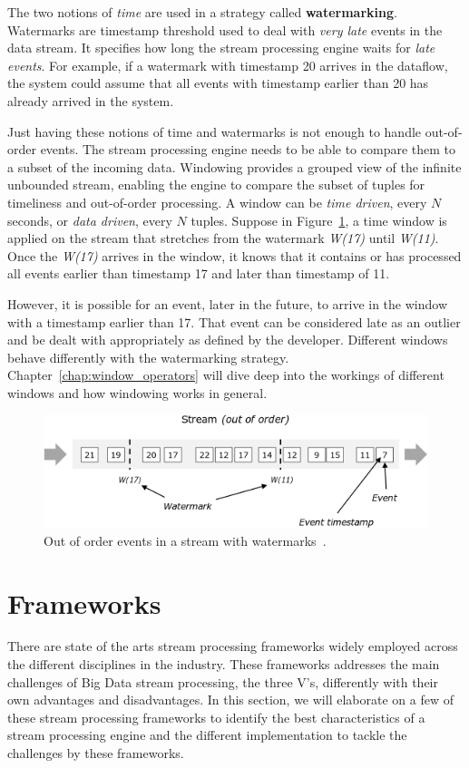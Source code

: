 The two notions of \emph{time} are used in a strategy called \textbf{watermarking}. 
Watermarks are timestamp threshold used to deal with \emph{very late} events 
in the data stream. It specifies how long the stream processing engine 
waits for \emph{late events}. For example, if a watermark with timestamp 
20 arrives in the dataflow, the system could assume that all events 
with timestamp earlier than 20 has already arrived in the system. 

Just having these notions of time and watermarks is not enough to 
handle out-of-order events. The stream processing engine needs to be able to compare them to a subset of the 
incoming data. Windowing provides a grouped view of the infinite unbounded stream, 
enabling the engine to compare the subset of tuples for timeliness and out-of-order 
processing. A window can be \emph{time driven}, every $N$ seconds, or \emph{data driven}, 
every $N$ tuples. 
Suppose in Figure~\ref{fig:watermark}, a time window is applied on the stream that
stretches from the watermark \emph{W(17)} until \emph{W(11)}. 
Once the \emph{W(17)} arrives in the window, it knows that it contains or has 
processed all events earlier than timestamp 17 and later than timestamp of 11.  

However, it is possible for an event, later in the future, to arrive in the window 
with a timestamp earlier than 17. That event can be considered late as an outlier and 
be dealt with appropriately as defined by the developer. Different windows 
behave differently with the watermarking strategy. Chapter~\ref{chap:window_operators}
will dive deep into the workings of different windows and how windowing works in 
general. 


\begin{figure}[htpb]
    \centering
    \includegraphics[width=0.8\linewidth]{fig/stream_watermark_out_of_order.png}
    \caption{Out of order events in a stream with watermarks~\cite{watermark_flink}.}
    \label{fig:watermark}
\end{figure}


\section{Frameworks}
\label{sec:frameworks}
There are state of the arts stream processing frameworks widely employed across the 
different disciplines in the industry. These frameworks addresses the main challenges of 
Big Data stream processing, the three V's, differently with their own advantages and 
disadvantages. In this section, we will elaborate 
on a few of these stream processing frameworks to identify the best characteristics of a 
stream processing engine and the different implementation to tackle the challenges by these 
frameworks.



